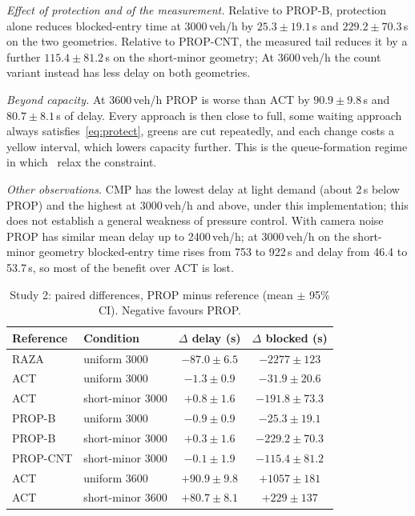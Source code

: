 \documentclass[conference]{IEEEtran}
\begin{document}
\emph{Effect of protection and of the measurement.} Relative to PROP-B, protection alone
reduces blocked-entry time at 3000\,veh/h by $25.3\pm19.1$\,s and $229.2\pm70.3$\,s on the
two geometries. Relative to PROP-CNT, the measured tail reduces it by a further
$115.4\pm81.2$\,s on the short-minor geometry; At 3600\,veh/h the count variant instead has less delay on both geometries.

\emph{Beyond capacity.} At 3600\,veh/h PROP is worse than ACT by $90.9\pm9.8$\,s and
$80.7\pm8.1$\,s of delay. Every approach is then close to full, some waiting approach
always satisfies~\eqref{eq:protect}, greens are cut repeatedly, and each change costs a
yellow interval, which lowers capacity further. This is the queue-formation regime in
which~\cite{mohajerpoor2023} relax the constraint.

\emph{Other observations.} CMP has the lowest delay at light demand (about 2\,s below
PROP) and the highest at 3000\,veh/h and above, under this implementation; this does not establish a general weakness of pressure control.
With camera noise PROP has similar mean delay up to 2400\,veh/h; at 3000\,veh/h on the short-minor
geometry blocked-entry time rises from 753 to 922\,s and delay from 46.4 to 53.7\,s, so
most of the benefit over ACT is lost.

\begin{table}[t]
\caption{Study 2: paired differences, PROP minus reference (mean $\pm$ 95\% CI). Negative favours PROP.}
\label{tab:paired}
\centering
\setlength{\tabcolsep}{3pt}
\begin{tabular}{llcc}
\toprule
Reference & Condition & $\Delta$ delay (s) & $\Delta$ blocked (s)\\
\midrule
RAZA & uniform 3000 & $-87.0\pm6.5$ & $-2277\pm123$\\
ACT & uniform 3000 & $-1.3\pm0.9$ & $-31.9\pm20.6$\\
ACT & short-minor 3000 & $+0.8\pm1.6$ & $-191.8\pm73.3$\\
PROP-B & uniform 3000 & $-0.9\pm0.9$ & $-25.3\pm19.1$\\
PROP-B & short-minor 3000 & $+0.3\pm1.6$ & $-229.2\pm70.3$\\
PROP-CNT & short-minor 3000 & $-0.1\pm1.9$ & $-115.4\pm81.2$\\
ACT & uniform 3600 & $+90.9\pm9.8$ & $+1057\pm181$\\
ACT & short-minor 3600 & $+80.7\pm8.1$ & $+229\pm137$\\
\bottomrule
\end{tabular}
\end{table}
\end{document}
